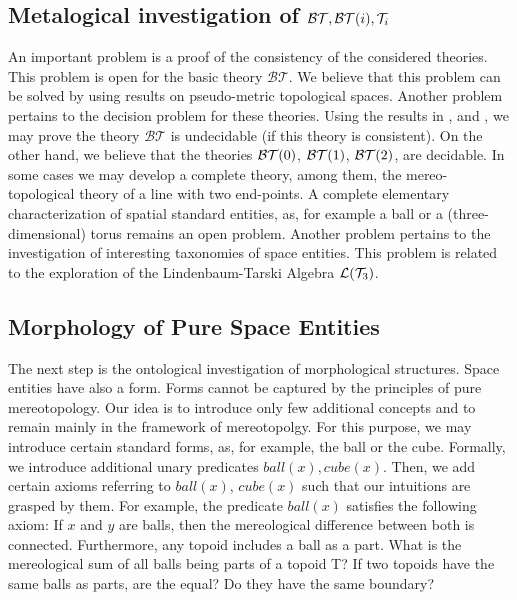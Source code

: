 \documentclass{ao2e}
\begin{document}
{\subsection{Metalogical investigation of ${\cal BT},{\cal BT}(i), {\cal T}_i$}
An important problem is a proof of the consistency of the considered theories. This problem is open
for  the basic theory $\mathcal{BT}$. We believe that this problem can be solved by using results on pseudo-metric topological spaces. Another problem pertains to the decision problem for these theories.
Using the results in \cite{herre-h-1973-a},
and \cite{hanf-w-1965-a}, we may prove the theory $\mathcal{BT}$ is undecidable (if this theory is consistent).
On the other hand, we believe that the theories ${\cal BT} (0)$, ${\cal BT} (1)$, ${\cal BT} (2)$, are decidable.
In some cases we may develop a complete theory, among them, the mereo-topological theory of a line with two
end-points. A complete elementary characterization of spatial standard entities, as, for example a ball or a (three-dimensional) torus remains an open problem. Another problem pertains to the investigation of interesting taxonomies of space entities. This problem is related to the exploration of the Lindenbaum-Tarski Algebra
${\cal L} ({\cal T}_3)$.\\

\subsection{Morphology of Pure Space Entities}
The next step is the ontological investigation of 
morphological structures. Space entities have also a form. Forms cannot be captured by the principles of pure mereotopology. Our idea is to introduce only few additional concepts
and to remain mainly in the framework of mereotopolgy. For this purpose, we may introduce certain standard forms,
as, for example, the ball or the cube. Formally, we introduce additional unary predicates
$ball(x), cube(x)$. Then, we add certain axioms referring to $ball(x)$, $cube(x)$ such that our intuitions
are grasped by them. For example, the predicate $ball(x)$ satisfies the following axiom:
If $x$ and $y$ are balls, then the mereological difference between both is connected.
Furthermore, any topoid includes a ball as a part. What is the mereological sum
of all balls being parts of a topoid T?  If two topoids have the same balls as parts, are the equal?
Do they have the same boundary?\\

}
\end{document}

